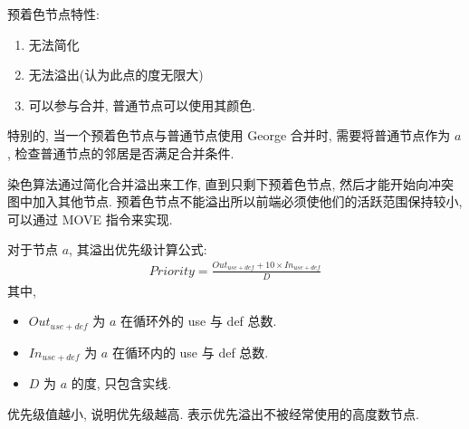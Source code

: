 预着色节点特性:
\begin{enumerate}
    \item 无法简化
    \item 无法溢出(认为此点的度无限大)
    \item 可以参与合并, 普通节点可以使用其颜色. 
\end{enumerate}
特别的, 当一个预着色节点与普通节点使用 George 合并时, 需要将普通节点作为 $a$, 检查普通节点的邻居是否满足合并条件. 


染色算法通过简化合并溢出来工作, 直到只剩下预着色节点, 然后才能开始向冲突图中加入其他节点. 预着色节点不能溢出所以前端必须使他们的活跃范围保持较小, 可以通过 MOVE 指令来实现. 


对于节点 $a$, 其溢出优先级计算公式: 
\begin{align*}
    Priority = \frac{Out_{use+def}+10\times In_{use+def}}{D}
\end{align*}
其中,
\begin{itemize}
    \item $Out_{use+def}$ 为 $a$ 在循环外的 use 与 def 总数.
    \item $In_{use+def}$ 为 $a$ 在循环内的 use 与 def 总数.
    \item $D$ 为 $a$ 的度, 只包含实线. 
\end{itemize}
优先级值越小, 说明优先级越高. 表示优先溢出不被经常使用的高度数节点. 
